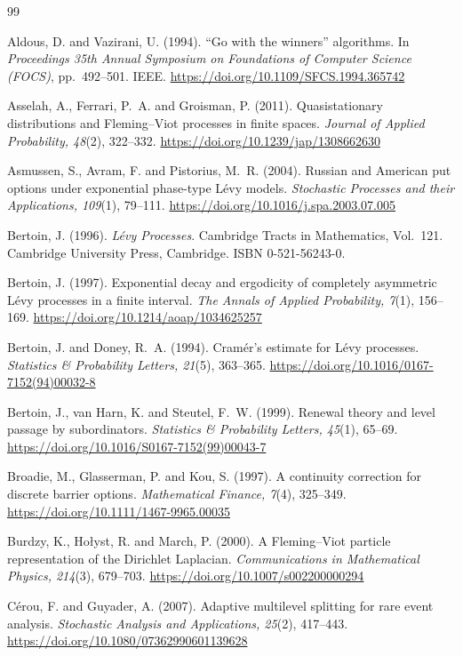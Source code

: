 \documentclass[11pt,a4paper]{article}
\theoremstyle{definition}
\theoremstyle{remark}
\newcommand{\1}{\mathbf 1}
\begin{document}
\begin{thebibliography}{99}

Aldous, D. and Vazirani, U. (1994). ``Go with the winners'' algorithms. In \emph{Proceedings 35th Annual Symposium on Foundations of Computer Science (FOCS)}, pp.~492--501. IEEE. \url{https://doi.org/10.1109/SFCS.1994.365742}

Asselah, A., Ferrari, P.~A. and Groisman, P. (2011). Quasistationary distributions and Fleming--Viot processes in finite spaces. \emph{Journal of Applied Probability, 48}(2), 322--332. \url{https://doi.org/10.1239/jap/1308662630}

Asmussen, S., Avram, F. and Pistorius, M.~R. (2004). Russian and American put options under exponential phase-type L\'evy models. \emph{Stochastic Processes and their Applications, 109}(1), 79--111. \url{https://doi.org/10.1016/j.spa.2003.07.005}

Bertoin, J. (1996). \emph{L\'evy Processes}. Cambridge Tracts in Mathematics, Vol.~121. Cambridge University Press, Cambridge. ISBN 0-521-56243-0.

Bertoin, J. (1997). Exponential decay and ergodicity of completely asymmetric L\'evy processes in a finite interval. \emph{The Annals of Applied Probability, 7}(1), 156--169. \url{https://doi.org/10.1214/aoap/1034625257}

Bertoin, J. and Doney, R.~A. (1994). Cram\'er's estimate for L\'evy processes. \emph{Statistics \& Probability Letters, 21}(5), 363--365. \url{https://doi.org/10.1016/0167-7152(94)00032-8}

Bertoin, J., van Harn, K. and Steutel, F.~W. (1999). Renewal theory and level passage by subordinators. \emph{Statistics \& Probability Letters, 45}(1), 65--69. \url{https://doi.org/10.1016/S0167-7152(99)00043-7}

Broadie, M., Glasserman, P. and Kou, S. (1997). A continuity correction for discrete barrier options. \emph{Mathematical Finance, 7}(4), 325--349. \url{https://doi.org/10.1111/1467-9965.00035}

Burdzy, K., Ho{\l}yst, R. and March, P. (2000). A Fleming--Viot particle representation of the Dirichlet Laplacian. \emph{Communications in Mathematical Physics, 214}(3), 679--703. \url{https://doi.org/10.1007/s002200000294}

C\'erou, F. and Guyader, A. (2007). Adaptive multilevel splitting for rare event analysis. \emph{Stochastic Analysis and Applications, 25}(2), 417--443. \url{https://doi.org/10.1080/07362990601139628}


\end{thebibliography}
\end{document}
